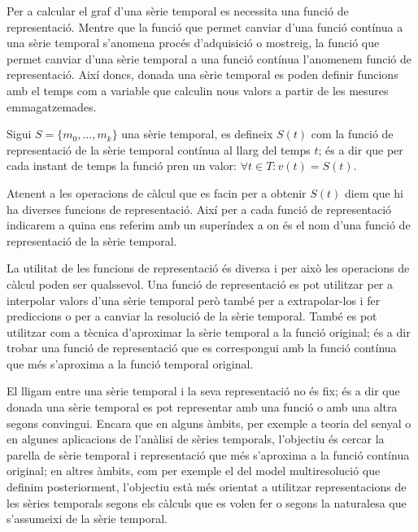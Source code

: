 Per a calcular el graf d'una sèrie temporal es necessita una funció de
representació. Mentre que la funció que permet canviar d'una funció
contínua a una sèrie temporal s'anomena procés d'adquisició o
mostreig, la funció que permet canviar d'una sèrie temporal a una
funció contínua l'anomenem funció de representació.  Així doncs,
donada una sèrie temporal es poden definir funcions amb el temps com a
variable que calculin nous valors a partir de les mesures
emmagatzemades.
\begin{definition}
  \label{def:model:frepr}
  Sigui $S=\{m_0,\ldots,m_k\}$ una sèrie temporal, es defineix $S(t)$
  com la funció de representació de la sèrie temporal contínua al
  llarg del temps $t$; és a dir que per cada instant de temps la
  funció pren un valor: $\forall t\in T: v(t) = S(t)$. 

  Atenent a les operacions de càlcul que es facin per a obtenir $S(t)$
  diem que hi ha diverses funcions de representació. Així per a cada
  funció de representació indicarem a quina ens referim amb un
  superíndex  a on
   és el nom d'una funció de representació
  de la sèrie temporal.
\end{definition}

La utilitat de les funcions de representació és diversa i per això les
operacions de càlcul poden ser qualssevol. Una funció de representació
es pot utilitzar per a interpolar valors d'una sèrie temporal però
també per a extrapolar-los i fer prediccions o per a canviar la
resolució de la sèrie temporal. També es pot utilitzar com a tècnica
d'aproximar la sèrie temporal a la funció original; és a dir trobar
una funció de representació que es correspongui amb la funció contínua
que més s'aproxima a la funció temporal original.


El lligam entre una sèrie temporal i la seva representació no és fix;
és a dir que donada una sèrie temporal es pot representar amb una
funció o amb una altra segons convingui.  Encara que en alguns àmbits,
per exemple a teoria del senyal o en algunes aplicacions de l'anàlisi
de sèries temporals, l'objectiu és cercar la parella de sèrie temporal
i representació que més s'aproxima a la funció contínua original; en
altres àmbits, com per exemple el del model multiresolució que definim
posteriorment, l'objectiu està més orientat a utilitzar
representacions de les sèries temporals segons els càlculs que es
volen fer o segons la naturalesa que s'assumeixi de la sèrie temporal.


